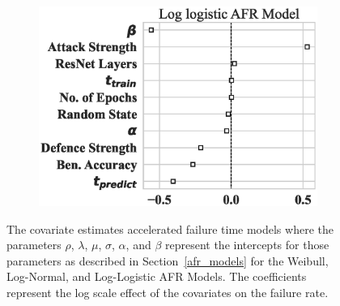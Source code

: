 \begin{figure}
\begin{subfigure}[t]{0.3\textwidth}
        \includegraphics[width=\textwidth]{mnist/log_logistic_aft.eps}
    \end{subfigure}

    \caption{The covariate estimates accelerated failure time models where the parameters $\rho$, $\lambda$, $\mu$, $\sigma$, $\alpha$, and $\beta$ represent the intercepts for those parameters as described in Section~\ref{afr_models} for the Weibull, Log-Normal, and Log-Logistic AFR Models. The coefficients represent the log scale effect of the covariates on the failure rate.}
    \label{fig:mnist/afr_models}
\end{figure}


